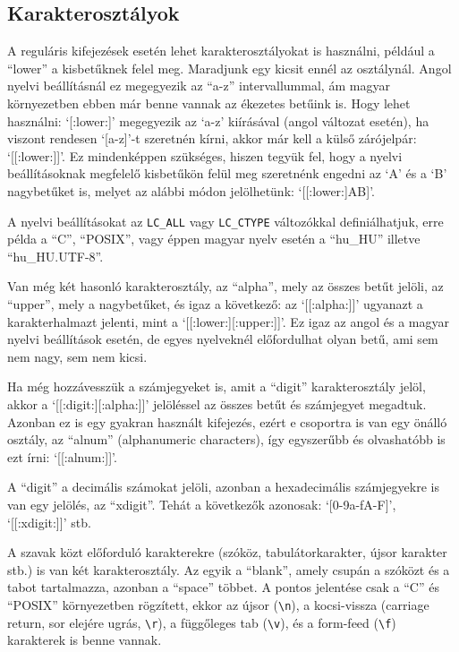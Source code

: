 \subsection{Karakterosztályok}

A reguláris kifejezések esetén lehet karakterosztályokat is használni, például a
``lower'' a kisbetűknek felel meg. Maradjunk egy kicsit ennél az
osztálynál. Angol nyelvi beállításnál ez megegyezik az ``a-z'' intervallummal,
ám magyar környezetben ebben már benne vannak az ékezetes betűink is. Hogy lehet
használni: `[:lower:]' megegyezik az `a-z' kiírásával (angol változat esetén),
ha viszont rendesen `[a-z]'-t szeretnén kírni, akkor már kell a külső
zárójelpár: `[[:lower:]]'. Ez mindenképpen szükséges, hiszen tegyük fel, hogy a
nyelvi beállításoknak megfelelő kisbetűkön felül meg szeretnénk engedni az `A'
és a `B' nagybetűket is, melyet az alábbi módon jelölhetünk: `[[:lower:]AB]'.

A nyelvi beállításokat az \texttt{LC\_ALL} vagy \texttt{LC\_CTYPE} változókkal
definiálhatjuk, erre példa a ``C'', ``POSIX'', vagy éppen magyar nyelv esetén a
``hu\_HU'' illetve ``hu\_HU.UTF-8''.

Van még két hasonló karakterosztály, az ``alpha'', mely az összes betűt
jelöli, az ``upper'', mely a nagybetűket, és igaz a következő: az `[[:alpha:]]'
ugyanazt a karakterhalmazt jelenti, mint a `[[:lower:][:upper:]]'. Ez igaz az
angol és a magyar nyelvi beállítások esetén, de egyes nyelveknél előfordulhat
olyan betű, ami sem nem nagy, sem nem kicsi.

Ha még hozzávesszük a számjegyeket is, amit a ``digit'' karakterosztály jelöl,
akkor a `[[:digit:][:alpha:]]' jelöléssel az összes betűt és számjegyet
megadtuk. Azonban ez is egy gyakran használt kifejezés, ezért e csoportra is van
egy önálló osztály, az ``alnum'' (alphanumeric characters), így egyszerűbb és
olvashatóbb is ezt írni: `[[:alnum:]]'.

A ``digit'' a decimális számokat jelöli, azonban a hexadecimális számjegyekre is
van egy jelölés, az ``xdigit''. Tehát a következők azonosak: `[0-9a-fA-F]',
`[[:xdigit:]]' stb.

A szavak közt előforduló karakterekre (szóköz, tabulátorkarakter, újsor karakter
stb.) is van két karakterosztály. Az egyik a ``blank'', amely csupán a szóközt
és a tabot tartalmazza, azonban a ``space'' többet. A pontos jelentése csak a
``C'' és ``POSIX'' környezetben rögzített, ekkor az újsor (\verb|\n|), a
kocsi-vissza (carriage return, sor elejére ugrás, \verb|\r|), a függőleges tab
(\verb|\v|), és a form-feed (\verb|\f|) karakterek is benne vannak.

